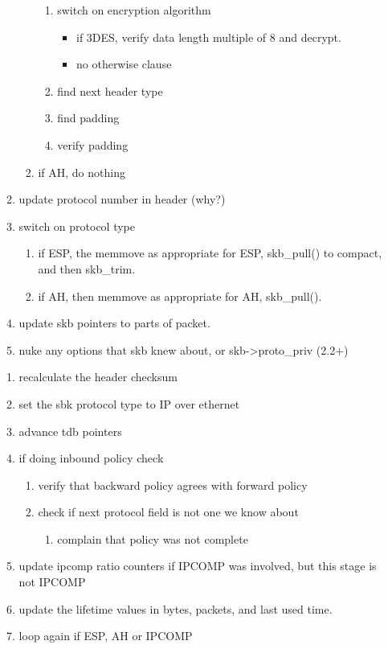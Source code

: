 \begin{enumerate}
\begin{enumerate}
\begin{enumerate}
\begin{enumerate}
				\item switch on encryption algorithm
				\begin{itemize}
					\item if 3DES, verify data length
						multiple of 8 and decrypt. 
					\item no otherwise clause
				\end{itemize}	
				\item find next header type
				\item find padding 
				\item verify padding
			\end{enumerate}
			\item if AH, do nothing
		\end{enumerate}
		\item update protocol number in header (why?)
		\item switch on protocol type
		\begin{enumerate}
			\item if ESP, the memmove as appropriate for ESP,
				skb\_pull() to compact, and then skb\_trim.
			\item if AH, then memmove as appropriate for AH, skb\_pull().
		\end{enumerate}
		\item update skb pointers to parts of packet.
		\item nuke any options that skb knew about, or skb->proto\_priv (2.2+)
	\end{enumerate}
	\begin{enumerate}
		\item recalculate the header checksum
		\item set the sbk protocol type to IP over ethernet
		\item advance tdb pointers
		\item if doing inbound policy check
		\begin{enumerate}
			\item verify that backward policy agrees with forward policy
			\item check if next protocol field is not one we know about
			\begin{enumerate}
				\item complain that policy was not complete
			\end{enumerate}
		\end{enumerate}
		\item update ipcomp ratio counters if IPCOMP was involved, but this
			stage is not IPCOMP
		\item update the lifetime values in bytes, packets, and last used
			time.
		\item loop again if ESP, AH or IPCOMP
	\end{enumerate}


\end{enumerate}
